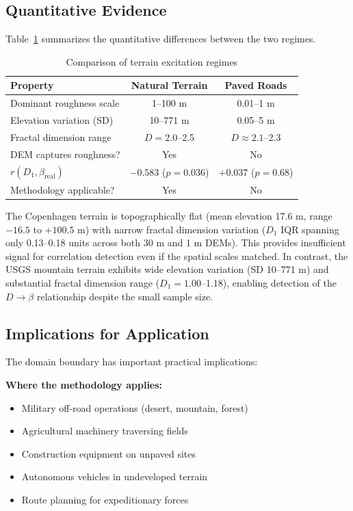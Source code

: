 \documentclass[11pt]{article}
\begin{document}
\subsection{Quantitative Evidence}

Table~\ref{tab:regimes} summarizes the quantitative differences between the two regimes.

\begin{table}[h]
\centering
\caption{Comparison of terrain excitation regimes}
\label{tab:regimes}
\small
\begin{tabular}{lcc}
\hline
\textbf{Property} & \textbf{Natural Terrain} & \textbf{Paved Roads} \\
\hline
Dominant roughness scale & 1--100 m & 0.01--1 m \\
Elevation variation (SD) & 10--771 m & 0.05--5 m \\
Fractal dimension range & $D = 2.0$--2.5 & $D \approx 2.1$--2.3 \\
DEM captures roughness? & Yes & No \\
$r(D_1, \beta_{\text{real}})$ & $-0.583$ ($p=0.036$) & $+0.037$ ($p=0.68$) \\
Methodology applicable? & Yes & No \\
\hline
\end{tabular}
\end{table}

The Copenhagen terrain is topographically flat (mean elevation 17.6 m, range $-16.5$ to $+100.5$ m) with narrow fractal dimension variation ($D_1$ IQR spanning only 0.13--0.18 units across both 30 m and 1 m DEMs). This provides insufficient signal for correlation detection even if the spatial scales matched. In contrast, the USGS mountain terrain exhibits wide elevation variation (SD 10--771 m) and substantial fractal dimension range ($D_1 = 1.00$--1.18), enabling detection of the $D \rightarrow \beta$ relationship despite the small sample size.

\subsection{Implications for Application}

The domain boundary has important practical implications:

\textbf{Where the methodology applies:}
\begin{itemize}
\item Military off-road operations (desert, mountain, forest)
\item Agricultural machinery traversing fields
\item Construction equipment on unpaved sites
\item Autonomous vehicles in undeveloped terrain
\item Route planning for expeditionary forces
\end{itemize}
\end{document}
